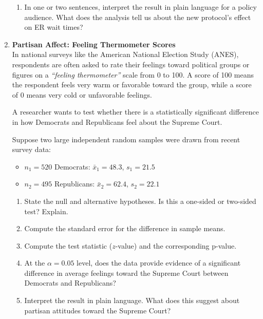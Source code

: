 \documentclass{article}
\begin{document}
\begin{enumerate}
\begin{enumerate}[label=(\alph*)]
          \item In one or two sentences, interpret the result in plain language for a policy audience. What does the analysis tell us about the new protocol’s effect on ER wait times?
        \end{enumerate}

\item \textbf{Partisan Affect: Feeling Thermometer Scores} \\[0.5em]
    In national surveys like the American National Election Study (ANES), respondents are often asked to rate their feelings toward political groups or figures on a \emph{“feeling thermometer”} scale from 0 to 100. A score of 100 means the respondent feels very warm or favorable toward the group, while a score of 0 means very cold or unfavorable feelings.

    A researcher wants to test whether there is a statistically significant difference in how Democrats and Republicans feel about the Supreme Court.

    Suppose two large independent random samples were drawn from recent survey data:
    \begin{itemize}
        \item $n_1 = 520$ Democrats: $\bar{x}_1 = 48.3$, $s_1 = 21.5$
        \item $n_2 = 495$ Republicans: $\bar{x}_2 = 62.4$, $s_2 = 22.1$
    \end{itemize}

    \begin{enumerate}[label=(\alph*)]
        \item State the null and alternative hypotheses. Is this a one-sided or two-sided test? Explain.
        \item Compute the standard error for the difference in sample means.
        \item Compute the test statistic ($z$-value) and the corresponding p-value.
        \item At the $\alpha = 0.05$ level, does the data provide evidence of a significant difference in average feelings toward the Supreme Court between Democrats and Republicans?
        \item Interpret the result in plain language. What does this suggest about partisan attitudes toward the Supreme Court?
    \end{enumerate}

\end{enumerate}
\end{document}
